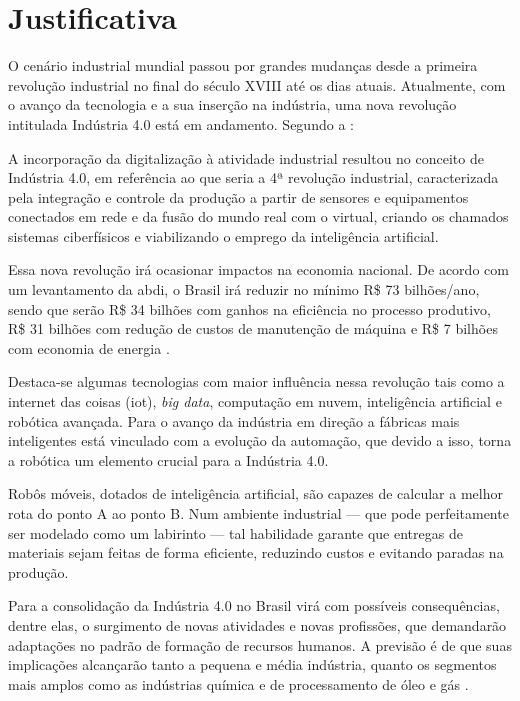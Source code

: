 \section{Justificativa}
\label{sec:justificativa}
O cenário industrial mundial passou por grandes mudanças desde a primeira revolução industrial no final do século XVIII até os dias atuais. Atualmente, com o avanço da tecnologia e a sua inserção na indústria, uma nova revolução intitulada Indústria 4.0 está em andamento. Segundo a :
\begin{quoting}[rightmargin=0cm,leftmargin=4cm]
\begin{singlespace}
{\footnotesize
A incorporação da digitalização à atividade industrial resultou no conceito de Indústria 4.0, em referência ao que seria a 4ª revolução industrial, caracterizada pela integração e controle da produção a partir de sensores e equipamentos conectados em rede e da fusão do mundo real com o virtual, criando os chamados sistemas ciberfísicos e viabilizando o emprego da inteligência artificial.
}
\end{singlespace}
\end{quoting}

Essa nova revolução irá ocasionar impactos na economia nacional. De acordo com um levantamento da \gls*{abdi}, o Brasil irá reduzir no mínimo R\$ 73 bilhões/ano, sendo que serão R\$ 34 bilhões com ganhos na eficiência no processo produtivo, R\$ 31 bilhões com redução de custos de manutenção de máquina e  R\$ 7 bilhões com economia de energia \cite{abdi}.

Destaca-se algumas tecnologias com maior influência nessa revolução tais como a internet das coisas (\gls*{iot}), \textit{big data}, computação em nuvem, inteligência artificial e robótica avançada. Para  o avanço da indústria em direção a fábricas mais inteligentes está vinculado com a evolução da automação, que devido a isso, torna a robótica um elemento crucial para a Indústria 4.0.

Robôs móveis, dotados de inteligência artificial, são capazes de calcular a melhor rota do ponto A ao ponto B. Num ambiente industrial — que pode perfeitamente ser modelado como um labirinto — tal habilidade garante que entregas de materiais sejam feitas de forma eficiente, reduzindo custos e evitando paradas na produção.

Para  a consolidação da Indústria 4.0 no Brasil virá com possíveis consequências, dentre elas, o surgimento de novas atividades e novas profissões, que demandarão adaptações no padrão de formação de recursos humanos. A previsão é de que suas implicações alcançarão tanto a pequena e média indústria, quanto os segmentos mais amplos como as indústrias química e de processamento de óleo e gás \cite{Gonzalez2018}.  

